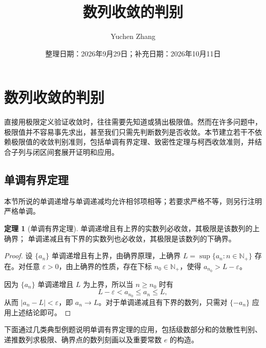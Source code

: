 \documentclass[UTF8, fontset=fandol, a4paper, 12pt]{ctexart}
\title{数列收敛的判别}
\author{Yuchen Zhang}
\date{整理日期：2026年9月29日；补充日期：2026年10月11日}
\makeatletter
\newcommand{\Nplus}{\mathbb N_{+}}
\theoremstyle{definition}
\newtheorem{theorem}{定理}
\renewcommand{\maketitle}{\begin{center}
{\LARGE\bfseries \@title\par}\vspace{0.6em}
\@author\par\vspace{0.2em}{\small\@date\par}
\end{center}}
\makeatother
\begin{document}
\maketitle
\setcounter{section}{3}
\setcounter{theorem}{8}
\section{数列收敛的判别}

直接用极限定义验证收敛时，往往需要先知道或猜出极限值。然而在许多问题中，极限值并不容易事先求出，甚至我们只需先判断数列是否收敛。本节建立若干不依赖极限值的收敛判别准则，包括单调有界定理、致密性定理与柯西收敛准则，并结合子列与闭区间套展开证明和应用。

\subsection*{单调有界定理}
本节所说的单调递增与单调递减均允许相邻项相等；若要求严格不等，则另行注明严格单调。

\begin{theorem}[单调有界定理]
单调递增且有上界的实数列必收敛，其极限是该数列的上确界；
单调递减且有下界的实数列也必收敛，其极限是该数列的下确界。
\end{theorem}
\begin{proof}
设 $\{a_n\}$ 单调递增且有上界，由确界原理，上确界 $L=\sup\{a_n:n\in\Nplus\}$ 存在。对任意 $\varepsilon>0$，由上确界的性质，存在下标 $n_0\in\Nplus$，使得 $a_{n_0}>L-\varepsilon$。

因为 $\{a_n\}$ 单调递增且 $L$ 为上界，所以当 $n\ge n_0$ 时有
\[
L-\varepsilon<a_{n_0}\le a_n\le L,
\]
从而 $|a_n-L|<\varepsilon$，即 $a_n\to L$。对于单调递减且有下界的数列，只需对 $\{-a_n\}$ 应用上述结论即可。
\end{proof}

下面通过几类典型例题说明单调有界定理的应用，包括级数部分和的敛散性判别、递推数列求极限、确界点的数列刻画以及重要常数 $e$ 的构造。
\end{document}
